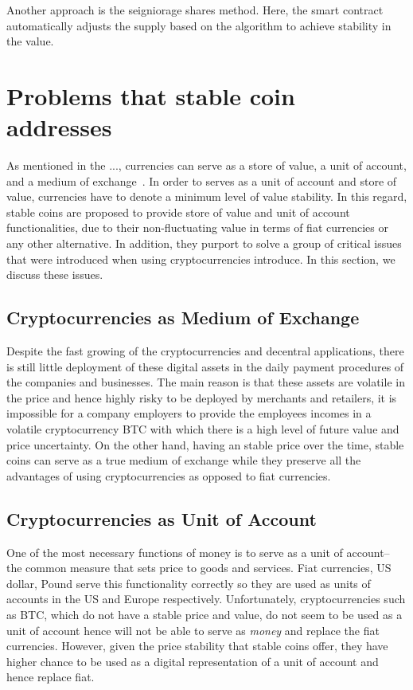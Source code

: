 Another approach is the seigniorage shares method\cite{overview}. Here, the smart contract automatically adjusts the supply based on the algorithm to achieve stability in the value.



\section{Problems that stable coin addresses}
As mentioned in the ..., currencies can serve as a store of value, a unit of account, and a medium of exchange~\cite{smithin2002money}. In order to serves as a unit of account and store of value, currencies have to denote a minimum level of value stability. In this regard, stable coins are proposed to provide store of value and unit of account functionalities, due to their non-fluctuating value in terms of fiat currencies or any other alternative. In addition, they purport to solve a group of critical issues that were introduced when using cryptocurrencies introduce. In this section, we discuss these issues.


\subsection{Cryptocurrencies as Medium of Exchange}
Despite the fast growing of the cryptocurrencies and decentral applications, there is still little deployment of these digital assets in the daily payment procedures of the companies and businesses. The main reason is that these assets are volatile in the price and hence highly risky to be deployed by merchants and retailers, \ie it is impossible for a company employers to provide the employees incomes in a volatile cryptocurrency \eg BTC with which there is a high level of future value and price uncertainty. On the other hand, having an stable price over the time, stable coins can serve as a true medium of exchange while they preserve all the advantages of using cryptocurrencies as opposed to fiat currencies.
\subsection{Cryptocurrencies as Unit of Account}
One of the most necessary functions of money is to serve as a unit of account-- the common measure that sets price to goods and services. Fiat currencies, \eg US dollar, Pound \etc serve this functionality correctly so they are used as units of accounts in the US and Europe respectively. Unfortunately, cryptocurrencies such as BTC, which do not have a stable price and value, do not seem to be used as a unit of account hence will not be able to serve as \textit{money} and replace the fiat currencies. However, given the price stability that stable coins offer, they have higher chance to be used as a digital representation of a unit of account and hence replace fiat.

